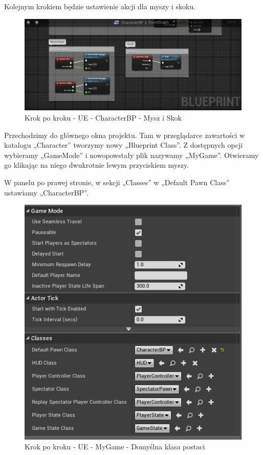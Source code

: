 \documentclass[openright]{xmgr}
\begin{document}
Kolejnym krokiem będzie ustawienie akcji dla myszy i skoku.

\begin{figure}[!htb]
    \begin{center}
    \includegraphics[scale=0.35]{Screeny/UeKrokPoKroku/UE-CharacterBP-MouseAndJump.png}
    \end{center}
    \caption{Krok po kroku - UE -  CharacterBP - Mysz i Skok}
\end{figure}

\newpage
Przechodzimy do głównego okna projektu. Tam w przeglądarce zawartości w katalogu „Character” tworzymy nowy „Blueprint Class”. Z dostępnych opcji wybieramy „GameMode” i nowopowstały plik nazywamy „MyGame”. Otwieramy go klikając na niego dwukrotnie lewym przyciskiem myszy.

W panelu po prawej stronie, w sekcji „Classes” w „Default Pawn Class” ustawiamy „CharacterBP”.

\begin{figure}[!htb]
    \begin{center}
    \includegraphics[scale=0.35]{Screeny/UeKrokPoKroku/UE-MyGame-Class.png}
    \end{center}
    \caption{Krok po kroku - UE -  MyGame - Domyślna klasa postaci}
\end{figure}
\end{document}
